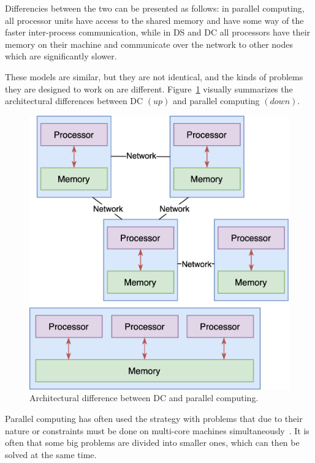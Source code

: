 Differencies between the two can be presented as follows: in parallel computing, all processor units have access to the shared memory and have some way of the faster inter-process communication, while in DS and DC all processors have their memory on their machine and communicate over the network to other nodes which are significantly slower. 

These models are similar, but they are not identical, and the kinds of problems they are designed to work on are different. Figure~\ref{fig:fig4} visually summarizes the architectural  differences between DC $(up)$ and parallel computing $(down)$.

\begin{figure}[H]
	\begin{center}
		\includegraphics[scale=0.8]{images/Figure4.png}
	\end{center}
	\vspace{-0.6cm}
	\caption{Architectural difference between DC and parallel computing.}
	\label{fig:fig4}
\end{figure}

\noindent
Parallel computing has often used the strategy with problems that due to their nature or constraints must be done on multi-core machines simultaneously~\cite{0072397}. It is often that some big problems are divided into smaller ones, which can then be solved at the same time. 

